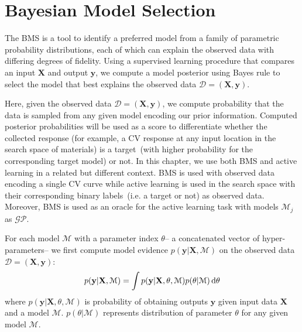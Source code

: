 \section{Bayesian Model Selection}
The BMS is a tool to identify a preferred model from a family of parametric probability distributions, each of which can explain the observed data with differing degrees of fidelity. 
Using a supervised learning procedure that compares an input \(\textbf{X}\) and output \(\textbf{y}\), we compute a model posterior using Bayes rule to select the model that best explains the observed data \(\mathcal{D}=(\textbf{X},\textbf{y})\). 

Here, given the observed data \(\mathcal{D}=(\textbf{X}, \textbf{y})\), we compute probability that the data is sampled from any given model encoding our prior information. 
Computed posterior probabilities will be used as a score to differentiate whether the collected response (for example, a CV response at any input location in the search space of materials) is a target~(with higher probability for the corresponding target model) or not. 
In this chapter, we use both BMS and active learning in a related but different context. 
BMS is used with observed data encoding a single CV curve while active learning is used in the search space with their corresponding binary labels~(i.e. a target or not) as observed data. 
Moreover, BMS is used as an oracle for the active learning task with models \(\mathcal{M}_j\) as \(\mathcal{GP}\).

For each model \(\mathcal{M}\) with a parameter index \(\theta\)-- a concatenated vector of hyper-parameters-- we first compute model evidence \(p(\textbf{y}\vert \textbf{X},\mathcal{M})\) on the observed data \(\mathcal{D}=(\textbf{X}, \textbf{y})\):
\begin{equation}
    p(\textbf{y}\vert \textbf{X},\mathcal{M}) = \int p(\textbf{y}\vert \textbf{X},\theta,\mathcal{M})p(\theta\vert \mathcal{M}) \mathop{}\!\mathrm{d} \theta
\label{eq:evidM}
\end{equation}
where \(p(\textbf{y}\vert \textbf{X},\theta,\mathcal{M})\) is probability of obtaining outputs \(\textbf{y}\) given input data \(\textbf{X}\) and a model \(\mathcal{M}\). \(p(\theta\vert \mathcal{M})\) represents distribution of parameter \(\theta\) for any given model \(\mathcal{M}\).

